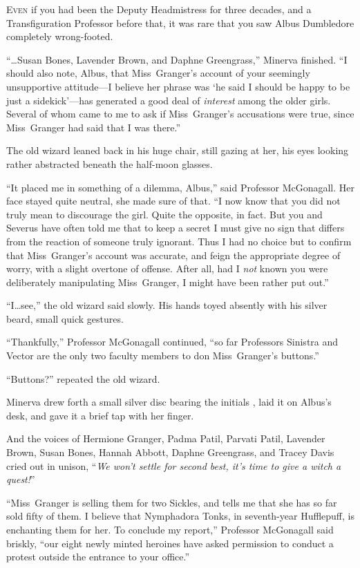 
\lettrine{E}{ven} if you had been the Deputy Headmistress for three decades, and a Transfiguration Professor before that, it was rare that you saw Albus Dumbledore completely wrong-footed.

“…Susan Bones, Lavender Brown, and Daphne Greengrass,” Minerva finished. “I should also note, Albus, that Miss~Granger’s account of your seemingly unsupportive attitude—I believe her phrase was ‘he said I should be happy to be just a sidekick’—has generated a good deal of \emph{interest} among the older girls. Several of whom came to me to ask if Miss~Granger’s accusations were true, since Miss~Granger had said that I was there.”

The old wizard leaned back in his huge chair, still gazing at her, his eyes looking rather abstracted beneath the half-moon glasses.

“It placed me in something of a dilemma, Albus,” said Professor McGonagall. Her face stayed quite neutral, she made sure of that. “I now know that you did not truly mean to discourage the girl. Quite the opposite, in fact. But you and Severus have often told me that to keep a secret I must give no sign that differs from the reaction of someone truly ignorant. Thus I had no choice but to confirm that Miss~Granger’s account was accurate, and feign the appropriate degree of worry, with a slight overtone of offense. After all, had I \emph{not} known you were deliberately manipulating Miss~Granger, I might have been rather put out.”

“I…see,” the old wizard said slowly. His hands toyed absently with his silver beard, small quick gestures.

“Thankfully,” Professor McGonagall continued, “so far Professors Sinistra and Vector are the only two faculty members to don Miss~Granger’s buttons.”

“Buttons?” repeated the old wizard.

Minerva drew forth a small silver disc bearing the initials \SPHEW, laid it on Albus’s desk, and gave it a brief tap with her finger.

And the voices of Hermione Granger, Padma Patil, Parvati Patil, Lavender Brown, Susan Bones, Hannah Abbott, Daphne Greengrass, and Tracey Davis cried out in unison, “\emph{We won’t settle for second best, it’s time to give a witch a quest!}”

“Miss~Granger is selling them for two Sickles, and tells me that she has so far sold fifty of them. I believe that Nymphadora Tonks, in seventh-year Hufflepuff, is enchanting them for her. To conclude my report,” Professor McGonagall said briskly, “our eight newly minted heroines have asked permission to conduct a protest outside the entrance to your office.”

